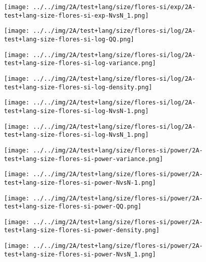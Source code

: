 \begin{figure}[H]
\centering	\texttt{[image: ../../img/2A/test+lang/size/flores-si/exp/2A-test+lang-size-flores-si-exp-NvsN\_1.png]}
\end{figure}
\begin{figure}[H]
\centering	\texttt{[image: ../../img/2A/test+lang/size/flores-si/log/2A-test+lang-size-flores-si-log-QQ.png]}
\end{figure}
\begin{figure}[H]
\centering	\texttt{[image: ../../img/2A/test+lang/size/flores-si/log/2A-test+lang-size-flores-si-log-variance.png]}
\end{figure}
\begin{figure}[H]
\centering	\texttt{[image: ../../img/2A/test+lang/size/flores-si/log/2A-test+lang-size-flores-si-log-density.png]}
\end{figure}
\begin{figure}[H]
\centering	\texttt{[image: ../../img/2A/test+lang/size/flores-si/log/2A-test+lang-size-flores-si-log-NvsN-1.png]}
\end{figure}
\begin{figure}[H]
\centering	\texttt{[image: ../../img/2A/test+lang/size/flores-si/log/2A-test+lang-size-flores-si-log-NvsN\_1.png]}
\end{figure}
\begin{figure}[H]
\centering	\texttt{[image: ../../img/2A/test+lang/size/flores-si/power/2A-test+lang-size-flores-si-power-variance.png]}
\end{figure}
\begin{figure}[H]
\centering	\texttt{[image: ../../img/2A/test+lang/size/flores-si/power/2A-test+lang-size-flores-si-power-NvsN-1.png]}
\end{figure}
\begin{figure}[H]
\centering	\texttt{[image: ../../img/2A/test+lang/size/flores-si/power/2A-test+lang-size-flores-si-power-QQ.png]}
\end{figure}
\begin{figure}[H]
\centering	\texttt{[image: ../../img/2A/test+lang/size/flores-si/power/2A-test+lang-size-flores-si-power-density.png]}
\end{figure}
\begin{figure}[H]
\centering	\texttt{[image: ../../img/2A/test+lang/size/flores-si/power/2A-test+lang-size-flores-si-power-NvsN\_1.png]}
\end{figure}
